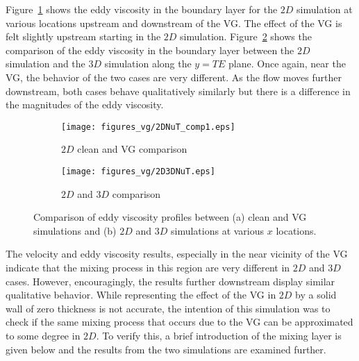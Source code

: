 Figure~\ref{fig:nut2d} shows the eddy viscosity in the boundary layer for the $2D$ simulation at various locations upstream and downstream of the VG. The effect of the VG is felt slightly upstream starting in the $2D$ simulation. Figure~\ref{fig:nutcmp} shows the comparison of the eddy viscosity in the boundary layer between the $2D$ simulation and the $3D$ simulation along the $y=TE$ plane. Once again, near the VG, the behavior of the two cases are very different. As the flow moves further downstream, both cases behave qualitatively similarly but there is a difference in the magnitudes of the eddy viscosity. 
\begin{figure}[h!]
\centering
\captionsetup{justification=centering}
\begin{subfigure}[b]{0.45\textwidth}
  \centering
  \captionsetup{justification=centering}
  \texttt{[image: figures\_vg/2DNuT\_comp1.eps]}
  \caption{$2D$ clean and VG comparison}
  \label{fig:nut2d}
\end{subfigure}
\begin{subfigure}[b]{0.45\textwidth}
  \centering
  \captionsetup{justification=centering}
  \texttt{[image: figures\_vg/2D3DNuT.eps]}
  \caption{$2D$ and $3D$ comparison}
  \label{fig:nutcmp}
 \end{subfigure}
 \caption{Comparison of eddy viscosity profiles between (a) clean and VG simulations and (b) $2D$ and $3D$ simulations at various $x$ locations.}
 \label{fig:nuturbvg}
\end{figure}


The velocity and eddy viscosity results, especially in the near vicinity of the VG indicate that the mixing process in this region are very different in $2D$ and $3D$ cases. However, encouragingly, the results further downstream display similar qualitative behavior. While representing the effect of the VG in $2D$ by a solid wall of zero thickness is not accurate, the intention of this simulation was to check if the same mixing process that occurs due to the VG can be approximated to some degree in $2D$. To verify this, a brief introduction of the mixing layer is given below and the results from the two simulations are examined further.

